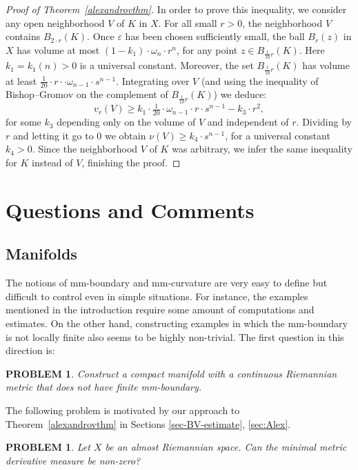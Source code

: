 \documentclass[12pt,leqno,intlimits]{amsart}
\numberwithin{equation}{section}
\newtheorem{quest}[thm]{PROBLEM}
\theoremstyle{definition}
\theoremstyle{remark}
\newcommand{\tref}[1]{Theorem~\ref{#1}}
\begin{document}
\begin{proof}[Proof of Theorem~\ref{alexandrovthm}]
In order to prove this inequality, we consider any open neighborhood $V$ of $K$ in $X$.
For all small $r>0$, the neighborhood $V$ contains $B_{2{\cdot}r} (K)$.
Once $\varepsilon$ has been chosen sufficiently small, the ball $B_r (z)$ in $X$ has volume at most
$ (1-k_1) \cdot \omega _n \cdot r^n$, for
any point $z\in B_{\frac 1 {10} r} (K)$. Here $ k_1=k_1(n)>0 $ is a universal constant.
 Moreover, the set $B_{\frac 1 {10} r} (K)$ has volume at least $\frac 1 {20} \cdot r\cdot \cdot \omega _{n-1} \cdot s^{n-1}$.
Integrating over $V$ (and using the inequality of Bishop--Gromov on the complement of $B_{\frac 1 {10} r} (K)$) we deduce:
$$v_r (V) \geq k_1\cdot \tfrac 1 {20} \cdot \omega _{n-1} \cdot r\cdot s^{n-1} - k_3 \cdot r^2 ,$$
for some $k_3$ depending only on the volume of $V$ and independent of $r$.
Dividing by $r$ and letting it go to $0$ we obtain $\nu (V) \geq k_4\cdot s^{n-1}$, for a universal constant $k_4>0$.
Since the neighborhood $V$ of $K$ was arbitrary,
we infer the same inequality for $K$ instead of $V$, finishing the proof.
\end{proof}

\section{Questions and Comments} \label{sec:final}
\subsection{Manifolds}
The notions of mm-boundary and mm-curvature are very easy to define but difficult to control even in simple situations.
For instance, the examples mentioned in the introduction require some amount of computations and estimates. On the other hand, constructing examples in which the mm-boundary is not locally finite also seems to be highly non-trivial. The first question in this direction is:

\begin{quest}
Construct a compact manifold with a continuous Riemannian metric
that does not have finite mm-boundary.
\end{quest}

The following problem is motivated by our approach to \tref{alexandrovthm} in Sections \ref{sec-BV-estimate}, \ref{sec:Alex}. 


\begin{quest} \label{qe:min}
Let $X$ be an almost Riemannian space. Can the minimal metric derivative measure be non-zero?
\end{quest}
\end{document}
